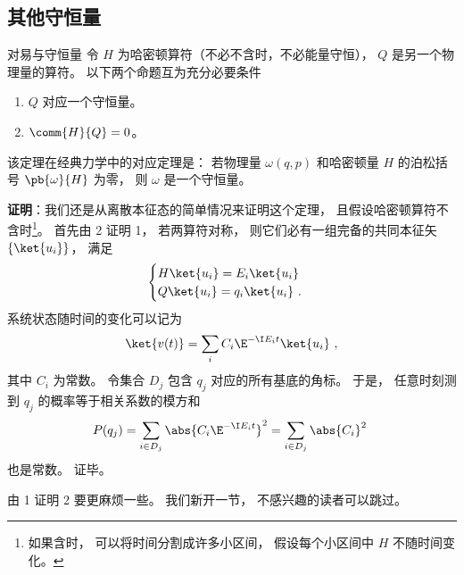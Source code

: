\subsection{其他守恒量}


\begin{theorem}{对易与守恒量}
令 $H$ 为哈密顿算符（不必不含时，不必能量守恒）， $Q$ 是另一个物理量的算符。 以下两个命题互为充分必要条件
\begin{enumerate}
\item $Q$ 对应一个守恒量。
\item $\comm{H}{Q} = 0$。
\end{enumerate}
\end{theorem}

该定理在经典力学中的对应定理是： 若物理量 $\omega(q, p)$ 和哈密顿量 $H$ 的泊松括号 $\pb{\omega}{H}$ 为零， 则 $\omega$ 是一个守恒量。

\textbf{证明}：我们还是从离散本征态的简单情况来证明这个定理， 且假设哈密顿算符不含时\footnote{如果含时， 可以将时间分割成许多小区间， 假设每个小区间中 $H$ 不随时间变化。}。 首先由 2 证明 1， 若两算符对称， 则它们必有一组完备的共同本征矢 $\{\ket{u_i}\}$， 满足
\begin{equation}
\begin{cases}
H \ket{u_i} = E_i \ket{u_i}\\
Q \ket{u_i} = q_i \ket{u_i}~.
\end{cases}
\end{equation}
系统状态随时间的变化可以记为
\begin{equation}
\ket{v(t)} = \sum_i C_i \E^{-\I E_i t} \ket{u_i}~,
\end{equation}
其中 $C_i$ 为常数。 令集合 $D_j$ 包含 $q_j$ 对应的所有基底的角标。 于是， 任意时刻测到 $q_j$ 的概率等于相关系数的模方和
\begin{equation}
P(q_j) = \sum_{i \in D_j} \abs{C_i \E^{-\I E_i t}}^2 = \sum_{i \in D_j} \abs{C_i}^2~
\end{equation}
也是常数。 证毕。

由 1 证明 2 要更麻烦一些。 我们新开一节， 不感兴趣的读者可以跳过。

